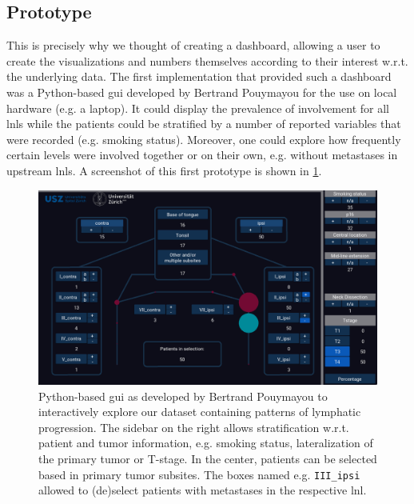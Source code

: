 \documentclass[\relativeRoot/main.tex]{subfiles}
\begin{document}
\subsection*{Prototype}
\label{subsec:lyprox:motivation:prototype}

This is precisely why we thought of creating a dashboard, allowing a user to create the visualizations and numbers themselves according to their interest w.r.t. the underlying data. The first implementation that provided such a dashboard was a Python-based \gls{gui} developed by Bertrand Pouymayou for the use on local hardware (e.g. a laptop). It could display the prevalence of involvement for all \glspl{lnl} while the patients could be stratified by a number of reported variables that were recorded (e.g. smoking status). Moreover, one could explore how frequently certain levels were involved together or on their own, e.g. without metastases in upstream \glspl{lnl}. A screenshot of this first prototype is shown in \cref{fig:lyprox:pouymayou_gui}.

\begin{figure}
    \centering
    \includegraphics[width=1.0\textwidth]{figures/pouymayou_gui.png}
    \caption[
        Prototype of a GUI to explore patterns of lymphatic progression
    ]{
        Python-based \gls{gui} as developed by Bertrand Pouymayou to interactively explore our dataset containing patterns of lymphatic progression. The sidebar on the right allows stratification w.r.t. patient and tumor information, e.g. smoking status, lateralization of the primary tumor or T-stage. In the center, patients can be selected based in primary tumor subsites. The boxes named e.g. \texttt{III\_ipsi} allowed to (de)select patients with metastases in the respective \gls{lnl}.
    }
    \label{fig:lyprox:pouymayou_gui}
\end{figure}
\end{document}
